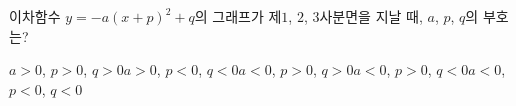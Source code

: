 이차함수 $y=-a(x+p)^2+q$의 그래프가 제$1$, $2$, $3$사분면을 지날 때, $a$, $p$, $q$의 부호는? 
\begin{choicesv}{$a>0$, $p>0$, $q>0$}{$a>0$, $p<0$, $q<0$}{$a<0$, $p>0$, $q>0$}{$a<0$, $p>0$, $q<0$}{$a<0$, $p<0$, $q<0$}\end{choicesv}
